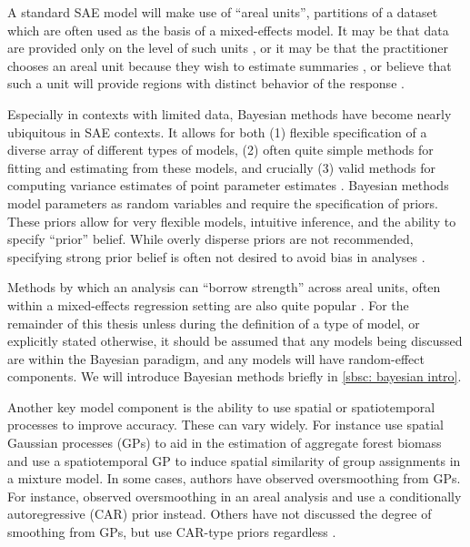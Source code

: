 \documentclass[twoside,12pt,bibstyle=chem-acs]{reedthesis}
\begin{document}
A standard SAE model will make use of ``areal units'', partitions of a dataset which are often used as the basis of a mixed-effects model. It may be that data are provided only on the level of such units \cite{hegarty_bayesian_2008}, or it may be that the practitioner chooses an areal unit because they wish to estimate summaries \cite{balocchi_spatial_2019}, or believe that such a unit will provide regions with distinct behavior of the response \cite{balocchi_crime_2023}.

Especially in contexts with limited data, Bayesian methods have become nearly ubiquitous in SAE contexts. It allows for both (1) flexible specification of a diverse array of different types of models, (2) often quite simple methods for fitting and estimating from these models, and crucially (3) valid methods for computing variance estimates of point parameter estimates \cite{citation?}. Bayesian methods model parameters as random variables and require the specification of priors. These priors allow for very flexible models, intuitive inference, and the ability to specify ``prior'' belief. While overly disperse priors are not recommended, specifying strong prior belief is often not desired to avoid bias in analyses \cite{gelman_prior_2006}.

Methods by which an analysis can ``borrow strength'' across areal units, often within a mixed-effects regression setting are also quite popular \cite{dorfman_towards_2018}. For the remainder of this thesis unless during the definition of a type of model, or explicitly stated otherwise, it should be assumed that any models being discussed are within the Bayesian paradigm, and any models will have random-effect components. We will introduce Bayesian methods briefly in \autoref{sbsc: bayesian intro}.

Another key model component is the ability to use spatial or spatiotemporal processes to improve accuracy. These can vary widely. For instance \citeauthor{white_hierarchical_2026} use spatial Gaussian processes (GPs) to aid in the estimation of aggregate forest biomass and \citeauthor{vanhatalo_spatiotemporal_2021} use a spatiotemporal GP to induce spatial similarity of group assignments in a mixture model. In some cases, authors have observed oversmoothing from GPs. For instance, \citeauthor{balocchi_crime_2023} observed oversmoothing in an areal analysis and use a conditionally autoregressive (CAR) prior instead. Others have not discussed the degree of smoothing from GPs, but use CAR-type priors regardless \cite{jaya_identifying_2021, more?}.
\end{document}
